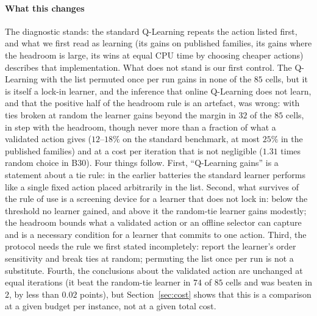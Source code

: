

\paragraph{What this changes} The diagnostic stands: the standard Q-Learning repeats the action listed first, and what we first read as learning (its gains on published families, its gains where the headroom is large, its wins at equal CPU time by choosing cheaper actions) describes that implementation. What does not stand is our first control. The Q-Learning with the list permuted once per run gains in none of the $85$ cells, but it is itself a lock-in learner, and the inference that online Q-Learning does not learn, and that the positive half of the headroom rule is an artefact, was wrong: with ties broken at random the learner gains beyond the margin in $32$ of the $85$ cells, in step with the headroom, though never more than a fraction of what a validated action gives ($12$--$18\%$ on the standard benchmark, at most $25\%$ in the published families) and at a cost per iteration that is not negligible ($1.31$ times random choice in B30). Four things follow. First, ``Q-Learning gains'' is a statement about a tie rule: in the earlier batteries the standard learner performs like a single fixed action placed arbitrarily in the list. Second, what survives of the rule of use is a screening device for a learner that does not lock in: below the threshold no learner gained, and above it the random-tie learner gains modestly; the headroom bounds what a validated action or an offline selector can capture and is a necessary condition for a learner that commits to one action. Third, the protocol needs the rule we first stated incompletely: report the learner's order sensitivity and break ties at random; permuting the list once per run is not a substitute. Fourth, the conclusions about the validated action are unchanged at equal iterations (it beat the random-tie learner in $74$ of $85$ cells and was beaten in $2$, by less than $0.02$ points), but Section~\ref{sec:cost} shows that this is a comparison at a given budget per instance, not at a given total cost.
